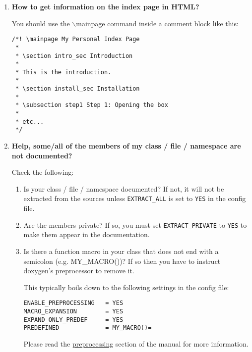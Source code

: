 \begin{enumerate}
\item {\bf How to get information on the index page in HTML?} 

You should use the $\backslash$mainpage command inside a comment block like this: 

\footnotesize\begin{verbatim}
/*! \mainpage My Personal Index Page
 *
 * \section intro_sec Introduction
 *
 * This is the introduction.
 *
 * \section install_sec Installation
 *
 * \subsection step1 Step 1: Opening the box
 *  
 * etc...
 */
\end{verbatim}
\normalsize


\item {\bf Help, some/all of the members of my class / file / namespace are not documented?}

Check the following: \begin{enumerate}
\item Is your class / file / namespace documented? If not, it will not be extracted from the sources unless {\tt EXTRACT\_\-ALL} is set to {\tt YES} in the config file. \item Are the members private? If so, you must set {\tt EXTRACT\_\-PRIVATE} to {\tt YES} to make them appear in the documentation. \item Is there a function macro in your class that does not end with a semicolon (e.g. MY\_\-MACRO())? If so then you have to instruct doxygen's preprocessor to remove it.

This typically boils down to the following settings in the config file:



\footnotesize\begin{verbatim}
ENABLE_PREPROCESSING   = YES
MACRO_EXPANSION        = YES
EXPAND_ONLY_PREDEF     = YES
PREDEFINED             = MY_MACRO()=
      \end{verbatim}
\normalsize


Please read the \hyperlink{preprocessing}{preprocessing} section of the manual for more information. \end{enumerate}



\end{enumerate}
